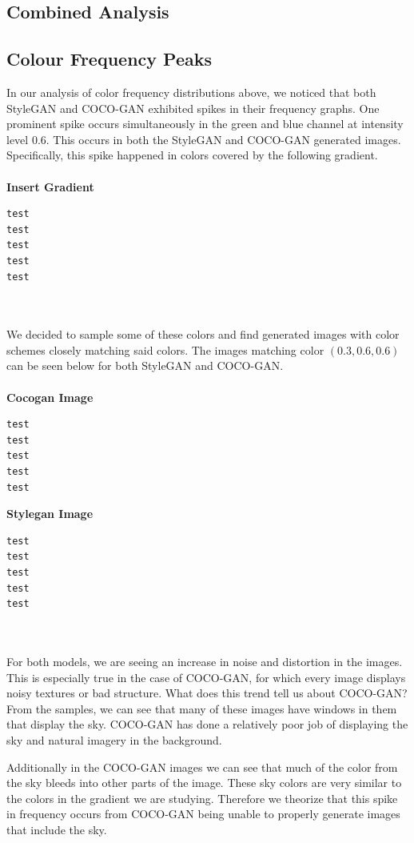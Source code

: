 \documentclass[10pt]{article}
\begin{document}
\begin{multicols*}{2}
        \section{Combined Analysis}
        \label{sec:combinedAnalysis}
        \subsection{Colour Frequency Peaks}
        In our analysis of color frequency distributions above, we noticed that both StyleGAN and COCO-GAN exhibited spikes in their frequency graphs.
        One prominent spike occurs simultaneously in the green and blue channel at intensity level 0.6.
        This occurs in both the StyleGAN and COCO-GAN generated images.
        Specifically, this spike happened in colors covered by the following gradient.
        \\\\
        \textbf{Insert Gradient}
        \begin{verbatim}
test
test
test
test
test
\end{verbatim}
        \\\\
        We decided to sample some of these colors and find generated images with color schemes closely matching said colors.
        The images matching color $(0.3, 0.6, 0.6)$ can be seen below for both StyleGAN and COCO-GAN.
        \\\\
        \textbf{Cocogan Image}\\
        \begin{verbatim}
test
test
test
test
test
\end{verbatim}
        \textbf{Stylegan Image}
        \begin{verbatim}
test
test
test
test
test
\end{verbatim}
        \\\\
        For both models, we are seeing an increase in noise and distortion in the images.
        This is especially true in the case of COCO-GAN, for which every image displays noisy textures or bad structure.
        What does this trend tell us about COCO-GAN?
        From the samples, we can see that many of these images have windows in them that display the sky.
        COCO-GAN has done a relatively poor job of displaying the sky and natural imagery in the background.

        Additionally in the COCO-GAN images we can see that much of the color from the sky bleeds into other parts of the image.
        These sky colors are very similar to the colors in the gradient we are studying.
        Therefore we theorize that this spike in frequency occurs from COCO-GAN being unable to properly generate images that include the sky.

\end{multicols*}
\end{document}
